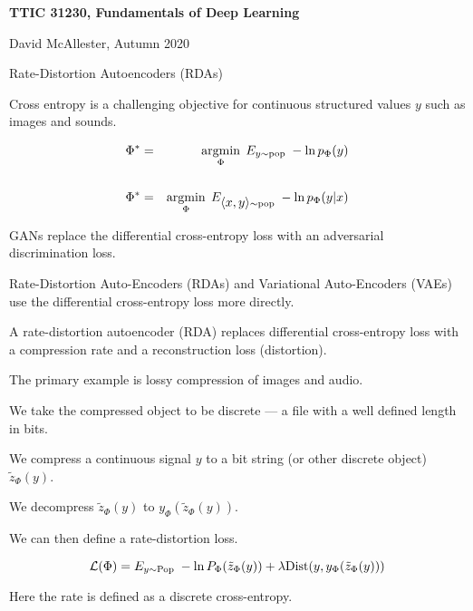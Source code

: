 





{\Huge

  \centerline{\bf TTIC 31230, Fundamentals of Deep Learning}
  \bigskip
  \centerline{David McAllester, Autumn 2020}
  \vfill
  \centerline{Rate-Distortion Autoencoders (RDAs)}
  \vfill
  \vfill


Cross entropy is a challenging objective for continuous structured values $y$ such as images and sounds.

\vfill
\begin{eqnarray*}
\Phi^* & = & \operatorname*{argmin}_\Phi \;E_{y \sim \mathrm{pop}}\;-\ln p_\Phi(y) \\
\\
\Phi^* & = & \operatorname*{argmin}_\Phi \;E_{{\mbox{$\langle x,y\rangle$}} \sim \mathrm{pop}}\;-\ln p_\Phi(y|x)
\end{eqnarray*}

\vfill
GANs replace the differential cross-entropy loss with an adversarial discrimination loss.

\vfill
Rate-Distortion Auto-Encoders (RDAs) and Variational Auto-Encoders (VAEs) use the differential cross-entropy loss more directly.


A rate-distortion autoencoder (RDA) replaces differential cross-entropy loss with a compression rate and
a reconstruction loss (distortion).

\vfill
The primary example is lossy compression of images and audio.

\vfill
We take the compressed object to be discrete --- a file with a well defined length in bits.


We compress a continuous signal $y$ to a bit string (or other discrete object) $\tilde{z}_\Phi(y)$.

\vfill
We decompress $\tilde{z}_\Phi(y)$ to $y_\Phi(\tilde{z}_\Phi(y))$.

\vfill
We can then define a rate-distortion loss.

{\color{red} $${\cal L}(\Phi) = E_{y \sim \mathrm{Pop}}\;-\ln P_\Phi(\tilde{z}_\Phi(y)) + \lambda \mathrm{Dist}(y,y_\Phi(\tilde{z}_\Phi(y)))$$}

\vfill
Here the rate is defined as a discrete cross-entropy.

}
